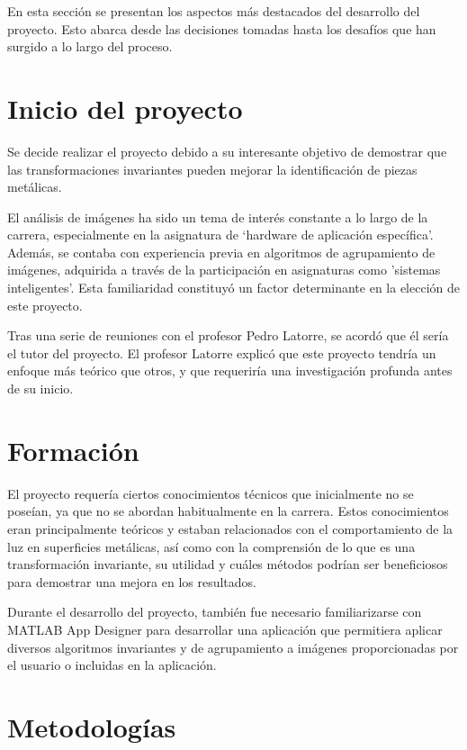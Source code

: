 
En esta sección se presentan los aspectos más destacados del desarrollo del proyecto. Esto abarca desde las decisiones tomadas hasta los desafíos que han surgido a lo largo del proceso.

\section{Inicio del proyecto}\label{inicio-del-proyecto}

Se decide realizar el proyecto debido a su interesante objetivo de demostrar que las transformaciones invariantes pueden mejorar la identificación de piezas metálicas.

El análisis de imágenes ha sido un tema de interés constante a lo largo de la carrera, especialmente en la asignatura de `hardware de aplicación específica'. Además, se contaba con experiencia previa en algoritmos de agrupamiento de imágenes, adquirida a través de la participación en asignaturas como 'sistemas inteligentes'. Esta familiaridad constituyó un factor determinante en la elección de este proyecto.

Tras una serie de reuniones con el profesor Pedro Latorre, se acordó que él sería el tutor del proyecto. El profesor Latorre explicó que este proyecto tendría un enfoque más teórico que otros, y que requeriría una investigación profunda antes de su inicio.

\section{Formación}\label{Formación}

El proyecto requería ciertos conocimientos técnicos que inicialmente no se poseían, ya que no se abordan habitualmente en la carrera. Estos conocimientos eran principalmente teóricos y estaban relacionados con el comportamiento de la luz en superficies metálicas, así como con la comprensión de lo que es una transformación invariante, su utilidad y cuáles métodos podrían ser beneficiosos para demostrar una mejora en los resultados.

Durante el desarrollo del proyecto, también fue necesario familiarizarse con MATLAB App Designer para desarrollar una aplicación que permitiera aplicar diversos algoritmos invariantes y de agrupamiento a imágenes proporcionadas por el usuario o incluidas en la aplicación.

\section{Metodologías}\label{Metodologías}

